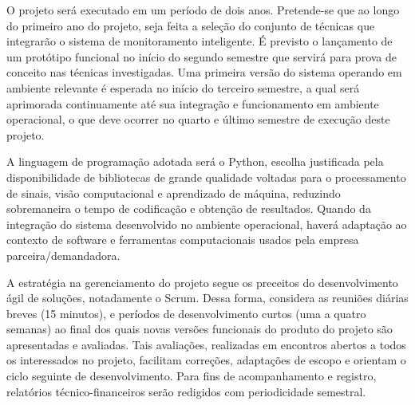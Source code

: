 O projeto será executado em um período de dois anos. Pretende-se que ao longo do primeiro ano do projeto, seja feita a seleção do conjunto de técnicas que integrarão o sistema de monitoramento inteligente. É previsto o lançamento de um protótipo funcional no início do segundo semestre que servirá para prova de conceito nas técnicas investigadas. Uma primeira versão do sistema operando em ambiente relevante é esperada no início do terceiro semestre, a qual será aprimorada continuamente até sua integração e funcionamento em ambiente operacional, o que deve ocorrer no quarto e último semestre de execução deste projeto.

A linguagem de programação adotada será o Python, escolha justificada pela disponibilidade de bibliotecas de grande qualidade voltadas para o processamento de sinais, visão computacional e aprendizado de máquina, reduzindo sobremaneira o tempo de codificação e obtenção de resultados. Quando da integração do sistema desenvolvido no ambiente operacional, haverá adaptação ao contexto de software e ferramentas computacionais usados pela empresa parceira/demandadora. 

A estratégia na gerenciamento do projeto segue os preceitos do desenvolvimento ágil de soluções, notadamente o Scrum. Dessa forma, considera as reuniões diárias breves (15 minutos), e períodos de desenvolvimento curtos (uma a quatro semanas) ao final dos quais novas versões funcionais do produto do projeto são apresentadas e avaliadas. Tais avaliações, realizadas em encontros abertos a todos os interessados no projeto, facilitam correções, adaptações de escopo e orientam o ciclo seguinte de desenvolvimento. Para fins de acompanhamento e registro, relatórios técnico-financeiros serão redigidos com periodicidade semestral.

